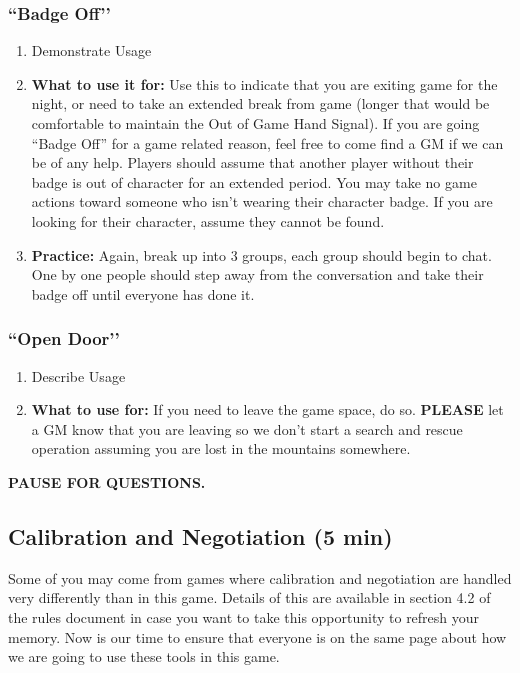 \documentclass[green]{GL2020}
\begin{document}
\subsubsection*{``Badge Off’’}
	\begin{enumerate}
		\item Demonstrate Usage
		\item \textbf{What to use it for:} Use this to indicate that you are exiting game for the night, or need to take an extended break from game (longer that would be comfortable to maintain the Out of Game Hand Signal). If you are going ``Badge Off'' for a game related reason, feel free to come find a GM if we can be of any help. Players should assume that another player without their badge is out of character for an extended period. You may take no game actions toward someone who isn’t wearing their character badge. If you are looking for their character, assume they cannot be found.
		\item \textbf{Practice:} Again, break up into 3 groups, each group should begin to chat. One by one people should step away from the conversation and take their badge off until everyone has done it.
	\end{enumerate}
	
\subsubsection*{``Open Door’’}	
	\begin{enumerate}
		\item Describe Usage
		\item \textbf{What to use for:} If you need to leave the game space, do so. \textbf{PLEASE} let a GM know that you are leaving so we don’t start a search and rescue operation assuming you are lost in the mountains somewhere.
	\end{enumerate}

\textbf{PAUSE FOR QUESTIONS.}

\subsection*{Calibration and Negotiation (5 min)}
Some of you may come from games where calibration and negotiation are handled very differently than in this game. Details of this are available in section 4.2 of the rules document in case you want to take this opportunity to refresh your memory. Now is our time to ensure that everyone is on the same page about how we are going to use these tools in this game.
\end{document}
